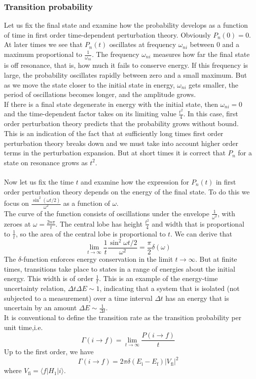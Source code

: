 \documentclass[cyan]{elegantnote}
\begin{document}
\subsubsection{Transition probability}
Let us fix the final state and examine how the probability develops as a function of time in first order time-dependent perturbation theory.
Obviously $P_n(0) = 0$. At later times we see that $P_n(t)$ oscillates at frequency $\omega_{ni}$ between $0$ and a maximum proportional to $\frac{1}{\omega_{ni}}$.
The frequency $\omega_{ni}$ measures how far the final state is off resonance, that is, how much it fails to conserve energy. If this frequency is large, the probability oscillates rapidly between zero and a small maximum. 
But as we move the state closer to the initial state in energy, $\omega_{ni}$ gets smaller, the period of oscillations becomes longer, and the amplitude grows.\\
If there is a final state degenerate in energy with the initial state, then $\omega_{ni}=0$ and the time-dependent factor takes on its limiting value $\frac{t^2}{4}$. In this case, first order perturbation theory predicts that the probability grows without bound. 
This is an indication of the fact that at sufficiently long times first order perturbation theory breaks down and we must take into account higher order terms in the perturbation expansion. But at short times it is correct that $P_n$ for a state on resonance grows as $t^2$.\\ \\
Now let us fix the time $t$ and examine how the expression for $P_n(t)$ in first order perturbation theory depends on the energy of the final state. To do this we focus on $\frac{\sin^2(\omega t/2)}{\omega^2}$ as a function of $\omega$.\\
The curve of the function consists of oscillations under the envelope $\frac{1}{\omega^2}$, with zeroes at $\omega = \frac{2n\pi}{t}$. The
central lobe has height $\frac{t^2}{4}$ and width that is proportional to $\frac{1}{t}$, so the area of the central lobe
is proportional to $t$. We can derive that
\[\lim_{t \to \infty} \frac{1}{t} \frac{\sin^2\omega t/2}{\omega^2} = \frac{\pi}{2}\delta(\omega)\]
The $\delta$-function enforces energy conservation in the limit $t \to \infty$. But at finite times, transitions take place to states in a range of energies about the initial energy.
This width is of order $\frac{1}{t}$. This is an example of
the energy-time uncertainty relation, $\Delta t \Delta E \sim 1$, indicating that a system that is isolated (not
subjected to a measurement) over a time interval $\Delta t$ has an energy that is uncertain by an amount $\Delta E \sim \frac{1}{\Delta t}$.\\
It is conventional to define the transition rate as the transition probability per unit time,i.e.
\[\Gamma(i \to f) = \lim_{t \to \infty}\frac{P(i \to f)}{t}\]
Up to the first order, we have
\[\Gamma(i \to f) = 2\pi \delta(E_{\mathrm{i}} - E_{\mathrm{f}}) |V_{\mathrm{fi}}|^2\]
where $V_{\mathrm{fi}} = \langle f | H_1 | i \rangle$.
\end{document}

